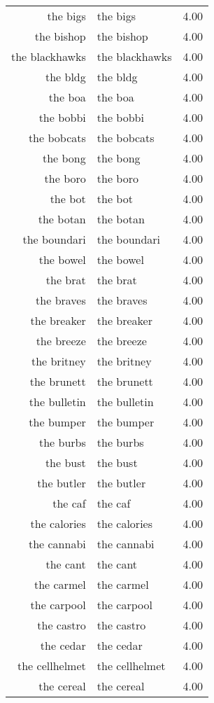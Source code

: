 \begin{table}[ht]
\begin{tabular}{rlr}
  the bigs & the bigs & 4.00 \\ 
  the bishop & the bishop & 4.00 \\ 
  the blackhawks & the blackhawks & 4.00 \\ 
  the bldg & the bldg & 4.00 \\ 
  the boa & the boa & 4.00 \\ 
  the bobbi & the bobbi & 4.00 \\ 
  the bobcats & the bobcats & 4.00 \\ 
  the bong & the bong & 4.00 \\ 
  the boro & the boro & 4.00 \\ 
  the bot & the bot & 4.00 \\ 
  the botan & the botan & 4.00 \\ 
  the boundari & the boundari & 4.00 \\ 
  the bowel & the bowel & 4.00 \\ 
  the brat & the brat & 4.00 \\ 
  the braves & the braves & 4.00 \\ 
  the breaker & the breaker & 4.00 \\ 
  the breeze & the breeze & 4.00 \\ 
  the britney & the britney & 4.00 \\ 
  the brunett & the brunett & 4.00 \\ 
  the bulletin & the bulletin & 4.00 \\ 
  the bumper & the bumper & 4.00 \\ 
  the burbs & the burbs & 4.00 \\ 
  the bust & the bust & 4.00 \\ 
  the butler & the butler & 4.00 \\ 
  the caf & the caf & 4.00 \\ 
  the calories & the calories & 4.00 \\ 
  the cannabi & the cannabi & 4.00 \\ 
  the cant & the cant & 4.00 \\ 
  the carmel & the carmel & 4.00 \\ 
  the carpool & the carpool & 4.00 \\ 
  the castro & the castro & 4.00 \\ 
  the cedar & the cedar & 4.00 \\ 
  the cellhelmet & the cellhelmet & 4.00 \\ 
  the cereal & the cereal & 4.00 \\ 

\end{tabular}
\end{table}

